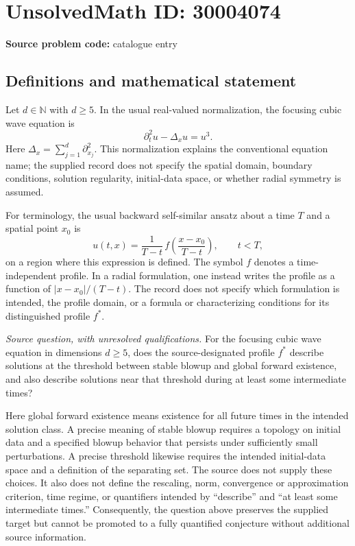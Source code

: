 \documentclass[11pt]{article}
\newcommand{\N}{\mathbb{N}}
\begin{document}
\section*{UnsolvedMath ID: 30004074}
\textbf{Source problem code:} catalogue entry
\subsection{Definitions and mathematical statement}
Let \(d\in\N\) with \(d\geq5\). In the usual real-valued normalization, the focusing cubic wave equation is
\[
\partial_t^2u-\Delta_xu=u^3.
\]
Here \(\Delta_x=\sum_{j=1}^d\partial_{x_j}^2\). This normalization explains the conventional equation name; the supplied record does not specify the spatial domain, boundary conditions, solution regularity, initial-data space, or whether radial symmetry is assumed.

For terminology, the usual backward self-similar ansatz about a time \(T\) and a spatial point \(x_0\) is
\[
u(t,x)=\frac{1}{T-t}\,f\!\left(\frac{x-x_0}{T-t}\right),\qquad t<T,
\]
on a region where this expression is defined. The symbol \(f\) denotes a time-independent profile. In a radial formulation, one instead writes the profile as a function of \(\lvert x-x_0\rvert/(T-t)\). The record does not specify which formulation is intended, the profile domain, or a formula or characterizing conditions for its distinguished profile \(f^*\).

\emph{Source question, with unresolved qualifications.} For the focusing cubic wave equation in dimensions \(d\geq5\), does the source-designated profile \(f^*\) describe solutions at the threshold between stable blowup and global forward existence, and also describe solutions near that threshold during at least some intermediate times?

Here global forward existence means existence for all future times in the intended solution class. A precise meaning of stable blowup requires a topology on initial data and a specified blowup behavior that persists under sufficiently small perturbations. A precise threshold likewise requires the intended initial-data space and a definition of the separating set. The source does not supply these choices. It also does not define the rescaling, norm, convergence or approximation criterion, time regime, or quantifiers intended by ``describe'' and ``at least some intermediate times.'' Consequently, the question above preserves the supplied target but cannot be promoted to a fully quantified conjecture without additional source information.
\end{document}
